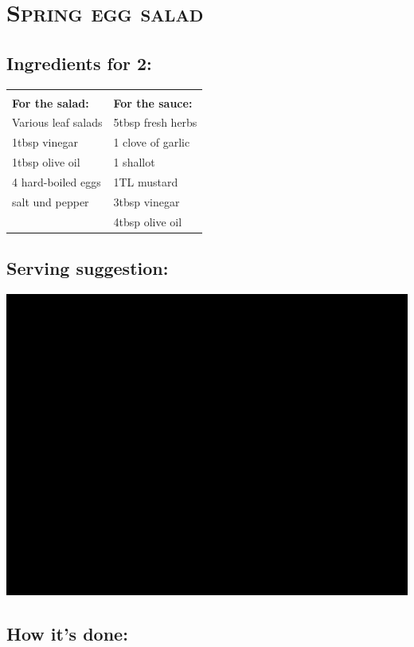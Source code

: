 \section{\textsc{Spring egg salad}}

\subsection*{Ingredients for 2:}

\begin{tabular}{p{7.5cm} p{7.5cm}}
	& \\
	\textbf{For the salad:} & \textbf{For the sauce:} \\
	Various leaf salads & 5tbsp fresh herbs \\
	1tbsp vinegar & 1 clove of garlic \\
	1tbsp olive oil & 1 shallot \\
	4 hard-boiled eggs & 1TL mustard \\
	salt und pepper & 3tbsp vinegar \\
	& 4tbsp olive oil
\end{tabular}

\subsection*{Serving suggestion:}

\includegraphics[width=\textwidth]{img/ph.jpg} \cite{fruehlingeiersalat}

\subsection*{How it's done:}

